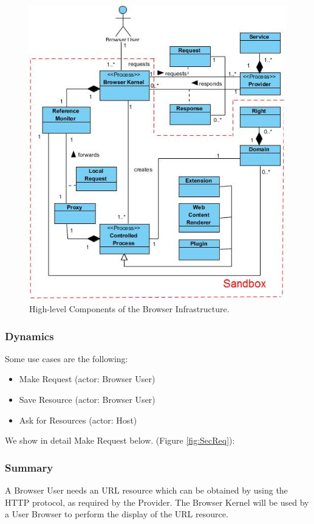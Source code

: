 \documentclass{sig-alternate-05-2015}
\begin{document}
    \begin{figure}[h!t]
      \centering
      \includegraphics[scale=0.7]{figures/BI/BrowserInfrastructure-v3.jpg}
      \caption{High-level Components of the Browser Infrastructure.}
      \label{fig:BIPatt}
    \end{figure}

    \subsubsection*{Dynamics}
    Some use cases are the following:
    \begin{itemize}
      \item Make Request (actor: Browser User)
      \item Save Resource (actor: Browser User)
      \item Ask for Resources (actor: Host)
    \end{itemize}
    We show in detail Make Request below. (Figure \ref{fig:SecReq}):
    \subsubsection*{Summary} A Browser User needs an URL resource which can be obtained by using the HTTP protocol, as required by the Provider. The Browser Kernel will be used by a User Browser to perform the display of the URL resource.
\end{document}
